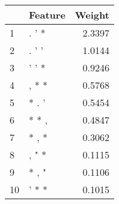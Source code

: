 \begin{tabular}{llr}
\toprule
{} & Feature &  Weight \\
\midrule
1  &   . ' * &  2.3397 \\
2  &   . ' ' &  1.0144 \\
3  &   ' ' * &  0.9246 \\
4  &   , * * &  0.5768 \\
5  &   * . ' &  0.5454 \\
6  &   * * , &  0.4847 \\
7  &   * , * &  0.3062 \\
8  &   , " * &  0.1115 \\
9  &   * , " &  0.1106 \\
10 &   ' * * &  0.1015 \\
\bottomrule
\end{tabular}
